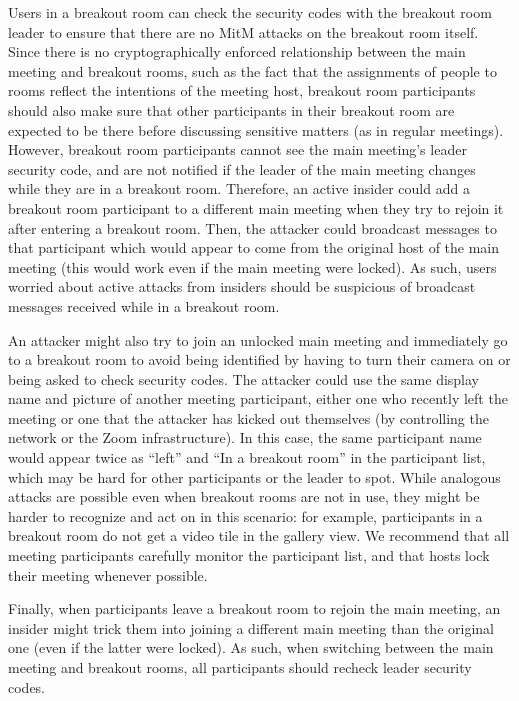 Users in a breakout room can check the security codes with the breakout room leader to ensure that
there are no MitM attacks on the breakout room itself. Since there is no cryptographically enforced
relationship between the main meeting and breakout rooms, such as the fact that the assignments of
people to rooms reflect the intentions of the meeting host, breakout room participants should also
make sure that other participants in their breakout room are expected to be there before discussing
sensitive matters (as in regular meetings). However, breakout room participants cannot see the main
meeting's leader security code, and are not notified if the leader of the main meeting changes while
they are in a breakout room. Therefore, an active insider could add a breakout room participant to a
different main meeting when they try to rejoin it after entering a breakout room. Then, the attacker
could broadcast messages to that participant which would appear to come from the original host of
the main meeting (this would work even if the main meeting were locked). As such, users worried
about active attacks from insiders should be suspicious of broadcast messages received while in a
breakout room. 

An attacker might also try to join an unlocked main meeting and immediately go to a breakout room to
avoid being identified by having to turn their camera on or being asked to check security codes. The
attacker could use the same display name and picture of another meeting participant, either one who
recently left the meeting or one that the attacker has kicked out themselves (by controlling the
network or the Zoom infrastructure). In this case, the same participant name would appear twice as
``left'' and ``In a breakout room'' in the participant list, which may be hard for other
participants or the leader to spot. While analogous attacks are possible even when breakout rooms
are not in use, they might be harder to recognize and act on in this scenario: for example,
participants in a breakout room do not get a video tile in the gallery view. We recommend that all
meeting participants carefully monitor the participant list, and that hosts lock their meeting
whenever possible.

Finally, when participants leave a breakout room to rejoin the main meeting, an insider might trick
them into joining a different main meeting than the original one (even if the latter were locked).
As such, when switching between the main meeting and breakout rooms, all participants should recheck
leader security codes.

